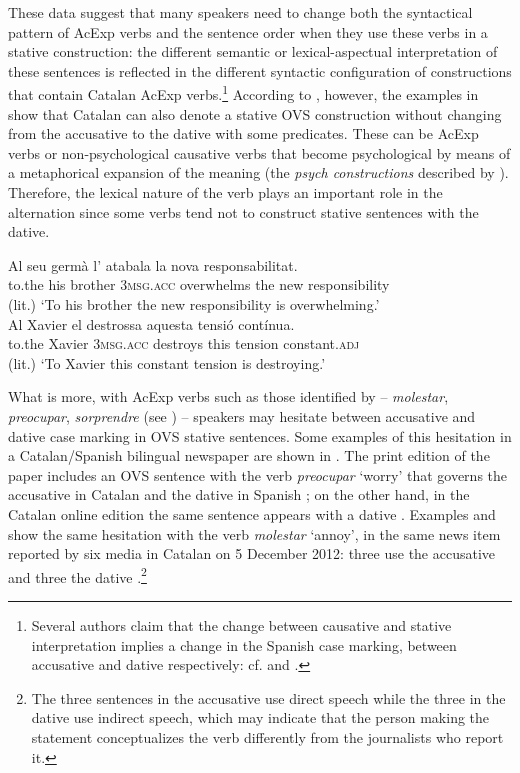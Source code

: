 \documentclass[output=paper,colorlinks,citecolor=brown,modfonts,nonflat]{langsci/langscibook}
\begin{document}
These data suggest that many speakers need to change both the syntactical pattern of AcExp verbs and the sentence order when they use these verbs in a stative construction: the different semantic or lexical-aspectual interpretation of these sentences is reflected in the different syntactic configuration of constructions that contain Catalan AcExp verbs.\footnote{Several authors claim that the change between causative and stative interpretation implies a change in the Spanish case marking, between accusative and dative respectively: cf. \citet{Fabregas2015experimentante,Viñas-de-Puig2017} and \citet{Ganeshan2019}.} According to \citep[14, 29--30]{Ginebra2003}, however, the examples in  show that Catalan can also denote a stative OVS construction without changing from the accusative to the dative with some predicates. These can be AcExp verbs  or non-psychological causative verbs that become psychological by means of a metaphorical expansion of the meaning  (the \textit{psych constructions} described by \citealt{Bouchard1995}). Therefore, the lexical nature of the verb plays an important role in the alternation since some verbs tend not to construct stative sentences with the dative.

\ea%
	\citealt[29--30]{Ginebra2003}
 \label{ex:royo:4}
 \ea \label{ex:royo:4a}
 \gll Al seu germà l’ atabala la nova responsabilitat.\\
to.the his brother \textsc{3msg.acc} overwhelms the new  responsibility\\
\glt (lit.) ‘To his brother the new responsibility is overwhelming.’ \\ 
 
 \ex \label{ex:royo:4b}
 \gll Al Xavier el destrossa aquesta tensió contínua.\\
to.the Xavier \textsc{3msg.acc} destroys   this       tension constant.\textsc{adj}\\
 \glt (lit.) ‘To Xavier this constant tension is destroying.’ 
 \z
 \z

What is more, with AcExp verbs such as those identified by \citet{CabréMateu1998} – \textit{molestar}, \textit{preocupar}, \textit{sorprendre} (see ) – speakers may hesitate between accusative and dative case marking in OVS stative sentences. Some examples of this hesitation in a Catalan/Spanish bilingual newspaper are shown in . The print edition of the paper includes an OVS sentence with the verb \textit{preocupar} ‘worry’ that governs the accusative in Catalan  and the dative in Spanish ; on the other hand, in the Catalan online edition the same sentence appears with a dative . Examples  and  show the same hesitation with the verb \textit{molestar} ‘annoy’, in the same news item reported by six media in Catalan on 5 December 2012: three use the accusative  and three the dative .\footnote{The three sentences in the accusative use direct speech while the three in the dative use indirect speech, which may indicate that the person making the statement conceptualizes the verb differently from the journalists who report it.}
\end{document}
